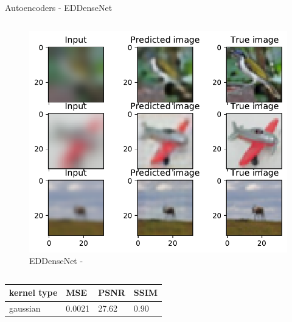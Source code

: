 \documentclass{beamer}
\begin{document}
\begin{frame}{Autoencoders - EDDenseNet\cite{densenet}}
{\begin{columns}
\begin{column}[c]{\paperwidth}
\begin{figure}
                    \includegraphics[width=.50\paperwidth,keepaspectratio]{densenet/test.pdf}
                    \caption{EDDenseNet - }
                \end{figure}                                        
            \end{column}            
        \end{columns}
        \begin{center}
            \tiny
            \begin{tabularx}{0.5\columnwidth}{X|XXX}
                \centering
                kernel type & MSE & PSNR & SSIM \\
                \hline
                gaussian & 0.0021 & 27.62 & 0.90
            \end{tabularx}
        \end{center}
    }
\end{frame}
\end{document}
